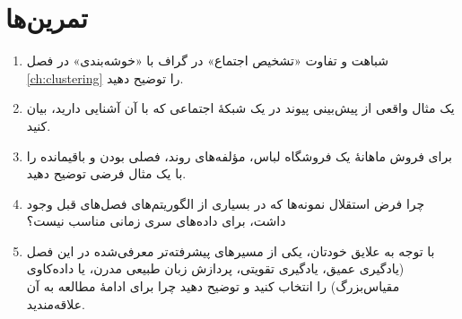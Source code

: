 \section*{تمرین‌ها}

\begin{enumerate}
    \item شباهت و تفاوت «تشخیص اجتماع» در گراف با «خوشه‌بندی» در
          فصل \ref{ch:clustering} را توضیح دهید.
    \item یک مثال واقعی از پیش‌بینی پیوند در یک شبکهٔ اجتماعی که با آن
          آشنایی دارید، بیان کنید.
    \item برای فروش ماهانهٔ یک فروشگاه لباس، مؤلفه‌های روند، فصلی بودن
          و باقیمانده را با یک مثال فرضی توضیح دهید.
    \item چرا فرض استقلال نمونه‌ها که در بسیاری از الگوریتم‌های فصل‌های
          قبل وجود داشت، برای داده‌های سری زمانی مناسب نیست؟
    \item با توجه به علایق خودتان، یکی از مسیرهای پیشرفته‌تر معرفی‌شده
          در این فصل (یادگیری عمیق، یادگیری تقویتی، پردازش زبان طبیعی
          مدرن، یا داده‌کاوی مقیاس‌بزرگ) را انتخاب کنید و توضیح دهید
          چرا برای ادامهٔ مطالعه به آن علاقه‌مندید.
\end{enumerate}
